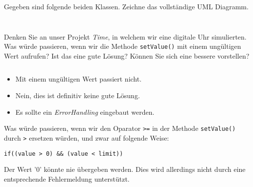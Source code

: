\documentclass[12pt,a4paper]{exam}
\begin{document}
    \begin{questions}

        \question[10] Gegeben sind folgende beiden Klassen. Zeichne das vollständige
        UML Diagramm.

        \begin{minipage}{0.45\textwidth}
            \inputminted[autogobble,linenos,frame=single]{java}{../java/academy/One.java}
        \end{minipage}
        \begin{minipage}{0.49\textwidth}
            \inputminted[autogobble,frame=single]{java}{../java/academy/Two.java}
        \end{minipage}
        \makeemptybox{5cm}
        \addpoints

        \newpage
        \question[6] Denken Sie an unser Projekt \emph{Time}, in welchem wir eine digitale
        Uhr simulierten. Was würde passieren, wenn wir die Methode \texttt
        {setValue()} mit einem ungültigen Wert aufrufen? Ist das eine gute Lösung? Können
        Sie sich eine bessere vorstellen?

        \inputminted[autogobble,firstline=53,lastline=57]
        {java}{../java/time/NumberDisplay.java}
        \addpoints

        \ifprintanswers
        \begin{solution}
            \begin{itemize}
                \item Mit einem ungültigen Wert passiert nicht.
                \item Nein, dies ist definitiv keine gute Lösung.
                \item Es sollte ein \emph{ErrorHandling} eingebaut werden.
            \end{itemize}
        \end{solution}
        \else\makeemptybox{2in}
        \fi


        \question[4] Was würde passieren, wenn wir den Oparator \texttt{>=} in der Methode
        \texttt{setValue()} durch \texttt{>} ersetzen würden, und zwar auf folgende
        Weise:

        \texttt{if((value > 0) && (value < limit))}
        \addpoints

        \ifprintanswers
        \begin{solution}
            Der Wert '0' könnte nie übergeben werden. Dies wird allerdings nicht
            durch eine entsprechende Fehlermeldung unterstützt.
        \end{solution}
        \else\makeemptybox{2in}
        \fi



\end{questions}
\end{document}
